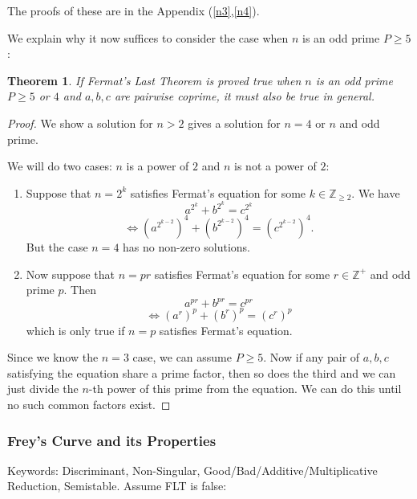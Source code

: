 \documentclass{article}
\newtheorem{theorem}{Theorem}[section]
\theoremstyle{definition}
\theoremstyle{definition}
\theoremstyle{definition}
\newcommand{\Z}{\mathbb{Z}}
\begin{document}
The proofs of these are in the Appendix (\ref{n3},\ref{n4}). %


We explain why it now suffices to consider the case when $n$ is an odd prime $P\geq5$:
\begin{theorem}
    If Fermat's Last Theorem is proved true when $n$ is an odd prime $P\geq5$ or $4$ and $a,b,c$ are pairwise coprime, it must also be true in general.
\end{theorem}
\begin{proof}
    We show a solution for $n>2$ gives a solution for $n=4$ or $n$ and odd prime.
    
    We will do two cases: $n$ is a power of $2$ and $n$ is not a power of $2$: 
    \newline
   \begin{enumerate}
       \item Suppose that $n=2^k$ satisfies Fermat's equation for some $k\in \Z_{\geq2}$. We have $$a^{2^k}+b^{2^k}=c^{2^k}$$ $$\iff (a^{2^{k-2}})^4+(b^{2^{k-2}})^4=(c^{2^{k-2}})^4.$$ But the case $n=4$ has no non-zero solutions.
       \item Now suppose that $n=pr$ satisfies Fermat's equation for some $r\in \Z^+$ and odd prime $p$. Then $$a^{pr}+b^{pr}=c^{pr}$$ $$\iff (a^r)^p+(b^r)^p=(c^r)^p$$ which is only true if $n=p$ satisfies Fermat's equation. 
   \end{enumerate}
   Since we know the $n=3$ case, we can assume $P\geq 5$.
   \newline\newline
   Now if any pair of $a,b,c$ satisfying the equation share a prime factor, then so does the third and we can just divide the $n$-th power of this prime from the equation. We can do this until no such common factors exist.
   \end{proof}

   

\subsubsection{Frey's Curve and its Properties}
Keywords: Discriminant, Non-Singular, Good/Bad/Additive/Multiplicative Reduction, Semistable. 
\newline\newline
Assume FLT is false:
\end{document}
